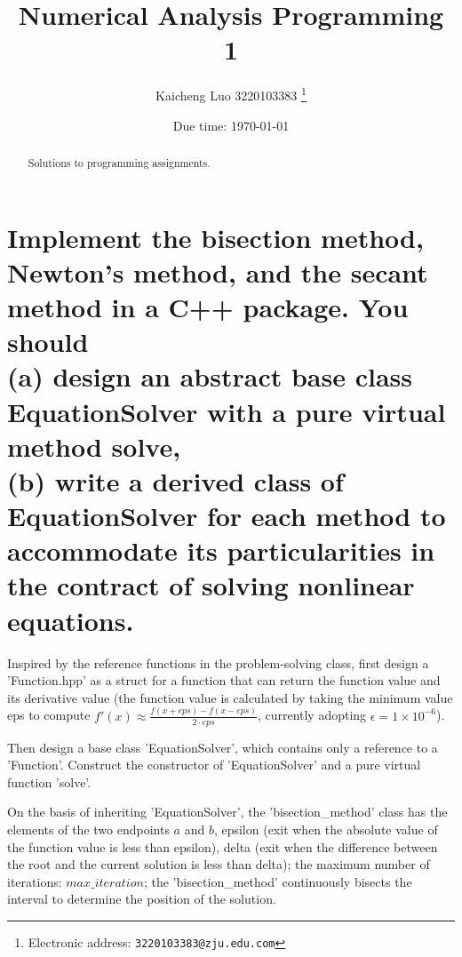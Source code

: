\documentclass[a4paper]{article}
\begin{document}
\title{Numerical Analysis Programming 1}

\author{Kaicheng Luo 3220103383
  \thanks{Electronic address: \texttt{3220103383@zju.edu.com}}}

\date{Due time: \today}

\maketitle

\begin{abstract}
    Solutions to programming assignments.
\end{abstract}

\section*{ Implement the bisection method, Newton’s method, and the secant method in a C++ package. You should\\ 
(a) design an abstract base class EquationSolver with a pure virtual method solve,\\
(b) write a derived class of EquationSolver for each method to accommodate its particularities in the contract of solving nonlinear equations.\\}

\hspace{0.5cm} Inspired by the reference functions in the problem-solving class, first design a 'Function.hpp' as a struct for a function that can return the function value and its derivative value (the function value is calculated by taking the minimum value eps to compute \(f'(x) \approx \frac{f(x+eps)-f(x-eps)}{2 \cdot eps}\), currently adopting \(\epsilon = 1 \times 10^{-6}\)).

Then design a base class 'EquationSolver', which contains only a reference to a 'Function'. Construct the constructor of 'EquationSolver' and a pure virtual function 'solve'.

On the basis of inheriting 'EquationSolver', the 'bisection\_method' class has the elements of the two endpoints \(a\) and \(b\), epsilon (exit when the absolute value of the function value is less than epsilon), delta (exit when the difference between the root and the current solution is less than delta); the maximum number of iterations: \(max\_iteration\); the 'bisection\_method' continuously bisects the interval to determine the position of the solution.
\end{document}
